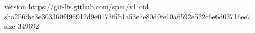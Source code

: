 version https://git-lfs.github.com/spec/v1
oid sha256:be3e303360f496912d9e0173f5b1a53e7e80d0fe10a6592e522c6e6d03716ee7
size 349692
